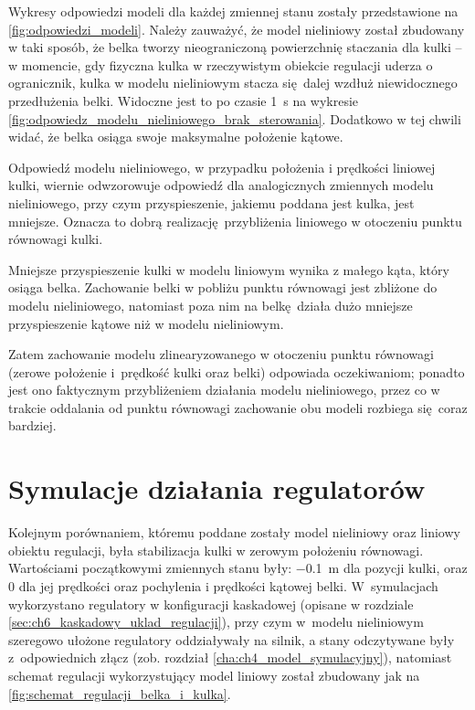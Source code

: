 Wykresy odpowiedzi modeli dla każdej zmiennej stanu zostały przedstawione na \cref{fig:odpowiedzi_modeli}. Należy zauważyć, że model nieliniowy został zbudowany w taki sposób, że belka tworzy nieograniczoną powierzchnię staczania dla kulki -- w momencie, gdy fizyczna kulka w rzeczywistym obiekcie regulacji uderza o ogranicznik, kulka w modelu nieliniowym stacza się dalej wzdłuż niewidocznego przedłużenia belki. Widoczne jest to po czasie \SI{1}{\second} na wykresie \ref{fig:odpowiedz_modelu_nieliniowego_brak_sterowania}. Dodatkowo w tej chwili widać, że belka osiąga swoje maksymalne położenie kątowe.

Odpowiedź modelu nieliniowego, w przypadku położenia i prędkości liniowej kulki, wiernie odwzorowuje odpowiedź dla analogicznych zmiennych modelu nieliniowego, przy czym przyspieszenie, jakiemu poddana jest kulka, jest mniejsze. Oznacza to dobrą realizację przybliżenia liniowego w otoczeniu punktu równowagi kulki.

Mniejsze przyspieszenie kulki w modelu liniowym wynika z małego kąta, który osiąga belka. Zachowanie belki w pobliżu punktu równowagi jest zbliżone do modelu nieliniowego, natomiast poza nim na belkę działa dużo mniejsze przyspieszenie kątowe niż w modelu nieliniowym.

Zatem zachowanie modelu zlinearyzowanego w otoczeniu punktu równowagi (zerowe położenie i~prędkość kulki oraz belki) odpowiada oczekiwaniom; ponadto jest ono faktycznym przybliżeniem działania modelu nieliniowego, przez co w trakcie oddalania od punktu równowagi zachowanie obu modeli rozbiega się coraz bardziej.

\section{Symulacje działania regulatorów}
\label{sec:ch9_symulacje_regulatorow}

Kolejnym porównaniem, któremu poddane zostały model nieliniowy oraz liniowy obiektu regulacji, była stabilizacja kulki w zerowym położeniu równowagi. Wartościami początkowymi zmiennych stanu były: \SI{-0.1}{\meter} dla pozycji kulki, oraz \num{0} dla jej prędkości oraz pochylenia i prędkości kątowej belki. W~symulacjach wykorzystano regulatory w konfiguracji kaskadowej (opisane w rozdziale \ref{sec:ch6_kaskadowy_uklad_regulacji}), przy czym w~modelu nieliniowym szeregowo ułożone regulatory oddziaływały na silnik, a stany odczytywane były z~odpowiednich złącz (zob. rozdział \ref{cha:ch4_model_symulacyjny}), natomiast schemat regulacji wykorzystujący model liniowy został zbudowany jak na \cref{fig:schemat_regulacji_belka_i_kulka}.

